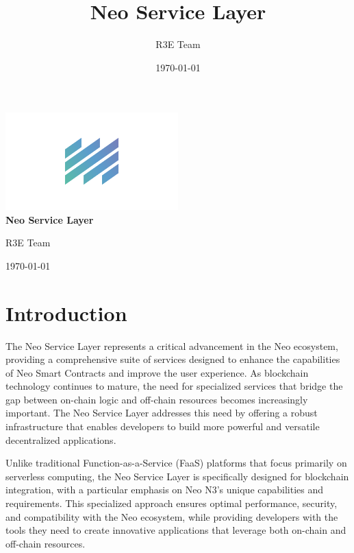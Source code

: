 \documentclass[11pt]{article}
\title{Neo Service Layer}
\author{R3E Team}
\date{\today}
\begin{document}
\setlength{\itemsep}{0.8em}

\begin{titlepage}
    \centering
    \vspace*{1cm}
    
    \includegraphics[width=0.5\textwidth]{figures/logo.png}\\[2cm]
    
    {\LARGE\bfseries Neo Service Layer\\}
    \vspace{1.5cm}
    
    {\large R3E Team\\}
    \vspace{1cm}
    
    {\large \today\\}
    
    \vfill
\end{titlepage}

\tableofcontents
\newpage


\section{Introduction}
\label{subsec:nsl-intro}

The Neo Service Layer represents a critical advancement in the Neo ecosystem, providing a comprehensive suite of services designed to enhance the capabilities of Neo Smart Contracts and improve the user experience. As blockchain technology continues to mature, the need for specialized services that bridge the gap between on-chain logic and off-chain resources becomes increasingly important. The Neo Service Layer addresses this need by offering a robust infrastructure that enables developers to build more powerful and versatile decentralized applications.

Unlike traditional Function-as-a-Service (FaaS) platforms that focus primarily on serverless computing, the Neo Service Layer is specifically designed for blockchain integration, with a particular emphasis on Neo N3's unique capabilities and requirements. This specialized approach ensures optimal performance, security, and compatibility with the Neo ecosystem, while providing developers with the tools they need to create innovative applications that leverage both on-chain and off-chain resources.
\end{document}
